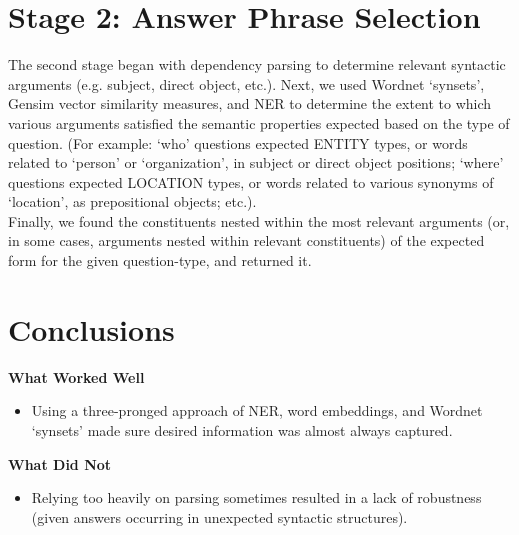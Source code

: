 \documentclass[a1,landscape]{a0poster}
\begin{document}
\begin{multicols}{3}
\section*{\LARGE Stage 2: Answer Phrase Selection}
The second stage began with dependency parsing to determine relevant syntactic arguments (e.g. subject, direct object, etc.). Next, we used Wordnet `synsets', Gensim vector similarity measures, and NER to determine the extent to which various arguments satisfied the semantic properties expected based on the type of question. (For example: `who' questions expected ENTITY types, or words related to `person' or `organization', in subject or direct object positions; `where' questions expected LOCATION types, or words related to various synonyms of `location', as prepositional objects; etc.). \\
Finally, we found the constituents nested within the most relevant arguments (or, in some cases, arguments nested within relevant constituents) of the expected form for the given question-type, and returned it.


\color{SaddleBrown} %

\section*{\LARGE Conclusions}
\textbf{What Worked Well}
\begin{itemize}
    \item Using a three-pronged approach of NER, word embeddings, and Wordnet `synsets' made sure desired information was almost always captured.
\end{itemize}
\vspace{0.7em}
\textbf{What Did Not}
\begin{itemize}
    \item Relying too heavily on parsing sometimes resulted in a lack of robustness (given answers occurring in unexpected syntactic structures).
\end{itemize}

\color{DarkSlateGray} %


\nocite{*} %

\end{multicols}
\end{document}
